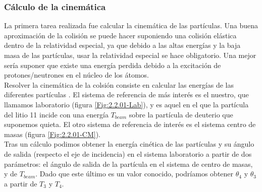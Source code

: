 \documentclass[12pt,a4paper]{article}
\numberwithin{equation}{section}
\numberwithin{figure}{section}
\begin{document}
\subsubsection{Cálculo de la cinemática}

La primera tarea realizada fue calcular la cinemática de las partículas. Una buena aproximación de la colisión se puede hacer suponiendo una colisión elástica dentro de la relatividad especial, ya que debido a las altas energías y la baja masa de las partículas, usar la relatividad especial se hace obligatorio. Una mejor sería suponer que existe una energía perdida debido a la excitación de protones/neutrones en el núcleo de los átomos.  \\

Resolver la cinemática de la colsión consiste en calcular las energías de las diferentes partículas . El sistema de referencia de más interés es el nuestro, que llamamos laboratorio (figura \ref{Fig:2.2.01-Lab}), y es aquel en el que la partícula del litio 11 incide con una energía $T_{beam}$ sobre la partícula de deuterio que suponemos quieta. El otro sistema de referencia de interés es el sistema centro de masas (figura \ref{Fig:2.2.01-CM}). \\

Tras un cálculo podimos obtener la energía cinética de las partículas y su ángulo de salida (respecto el eje de incidencia) en el sistema laboratorio a partir de dos parámetros: el ángulo de salida de la partícula en el sistema de centro de masas, y de $T_{beam}$. Dado que este último es un valor conocido, podríamos obtener $\theta_4$ y $\theta_3$ a partir de $T_3$ y $T_4$.   \\
\end{document}
